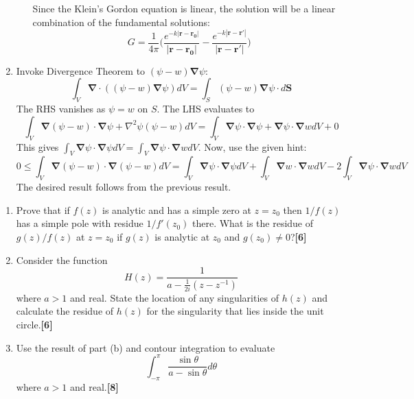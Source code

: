 \documentclass[a4paper]{article}
\begin{document}
\begin{ans}
\begin{enumerate}[label=(\alph*)]
\begin{enumerate}[label=(\roman*)]
Since the Klein's Gordon equation is linear, the solution will be a linear combination of the fundamental solutions:
$$G=\frac{1}{4\pi}\bigg(\frac{e^{-k|\mathbf{r}-\mathbf{r_0}|}}{|\mathbf{r}-\mathbf{r_0}|}-\frac{e^{-k|\mathbf{r}-\mathbf{r'}|}}{|\mathbf{r}-\mathbf{r'}|}\bigg)$$
\end{enumerate}
\item Invoke Divergence Theorem to $(\psi-w)\boldsymbol{\nabla}\psi$:
$$\int_V\boldsymbol{\nabla}\cdot((\psi-w)\boldsymbol{\nabla}\psi)dV=\int_S(\psi-w)\boldsymbol{\nabla}\psi\cdot d\mathbf{S}$$
The RHS vanishes as $\psi=w$ on $S$. The LHS evaluates to
$$\int_V\boldsymbol{\nabla}(\psi-w)\cdot\boldsymbol{\nabla}\psi+\nabla^2\psi(\psi-w)dV=\int_V\boldsymbol{\nabla}\psi\cdot\boldsymbol{\nabla}\psi+\boldsymbol{\nabla}\psi\cdot\boldsymbol{\nabla}wdV+0$$
This gives $\int_V\boldsymbol{\nabla}\psi\cdot\boldsymbol{\nabla}\psi dV=\int_V\boldsymbol{\nabla}\psi\cdot\boldsymbol{\nabla}w dV$. Now, use the given hint:
$$0\leq\int_V\boldsymbol{\nabla}(\psi-w)\cdot\boldsymbol{\nabla}(\psi-w)dV=\int_V\boldsymbol{\nabla}\psi\cdot\boldsymbol{\nabla}\psi dV+\int_V\boldsymbol{\nabla}w\cdot\boldsymbol{\nabla}wdV-2\int_V\boldsymbol{\nabla}\psi\cdot\boldsymbol{\nabla}wdV$$
The desired result follows from the previous result. 
\end{enumerate}
\end{ans}
\newpage
\begin{qns}\leavevmode
\begin{enumerate}[label=(\alph*)]
\item Prove that if $f(z)$ is analytic and has a simple zero at $z = z_0$ then $1/f(z)$ has a simple pole with residue $1/f'(z_0)$ there. What is the residue of $g(z)/f(z)$ at $z = z_0$ if $g(z)$ is analytic at $z_0$ and $g(z_0)\neq 0$?\hfill\textbf{[6]}
\item Consider the function
$$H(z)=\frac{1}{a-\frac{1}{2i}(z-z^{-1})}$$
where $a>1$ and real. State the location of any singularities of $h(z)$ and calculate the residue of $h(z)$ for the singularity that lies inside the unit circle.\hfill\textbf{[6]}
\item Use the result of part (b) and contour integration to evaluate
$$\int_{-\pi}^\pi\frac{\sin\theta}{a-\sin\theta}d\theta$$
where $a>1$ and real.\hfill\textbf{[8]}
\end{enumerate}
\end{qns}
\end{document}
